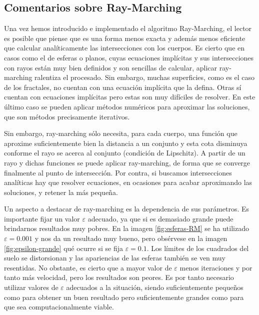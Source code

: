 \subsection{Comentarios sobre Ray-Marching}
\label{subsection:comentarios}

Una vez hemos introducido e implementado el algoritmo Ray-Marching, el lector es posible que piense que es una forma menos exacta y además menos eficiente que calcular analíticamente las intersecciones con los cuerpos. Es cierto que en casos como el de esferas o planos, cuyas ecuaciones implícitas y sus intersecciones con rayos están muy bien definidos y son sencillas de calcular, aplicar ray-marching ralentiza el procesado. Sin embargo, muchas superficies, como es el caso de los fractales, no cuentan con una ecuación implícita que la defina. Otras sí cuentan con ecuaciones implícitas pero estas son muy difíciles de resolver. En este último caso se pueden aplicar métodos numéricos para aproximar las soluciones, que son métodos precisamente iterativos. 

Sin embargo, ray-marching sólo necesita, para cada cuerpo, una función que aproxime suficientemente bien la distancia a un conjunto y esta cota disminuya conforme el rayo se acerca al conjunto (condición de Lipschitz). A partir de un rayo y dichas funciones se puede aplicar ray-marching, de forma que se converge finalmente al punto de intersección. Por contra, si buscamos intersecciones analíticas hay que resolver ecuaciones, en ocasiones para acabar aproximando las soluciones, y retener la más pequeña.

Un aspecto a destacar de ray-marching es la dependencia de sus parámetros. Es importante fijar un valor $\varepsilon$ adecuado, ya que si es demasiado grande puede brindarnos resultados muy pobres. En la imagen \ref{fig:esferas-RM} se ha utilizado $\varepsilon=0.001$ y nos da un resultado muy bueno, pero obsérvese en la imagen \ref{fig:epsilon-grande} qué ocurre si se fija $\varepsilon=0.1$. Los límites de los cuadrados del suelo se distorsionan y las apariencias de las esferas también se ven muy resentidas. No obstante, es cierto que a mayor valor de $\varepsilon$ menos iteraciones y por tanto más velocidad, pero los resultados son peores. Es por tanto necesario utilizar valores de $\varepsilon$ adecuados a la situación, siendo suficientemente pequeños como para obtener un buen resultado pero suficientemente grandes como para que sea computacionalmente viable.

